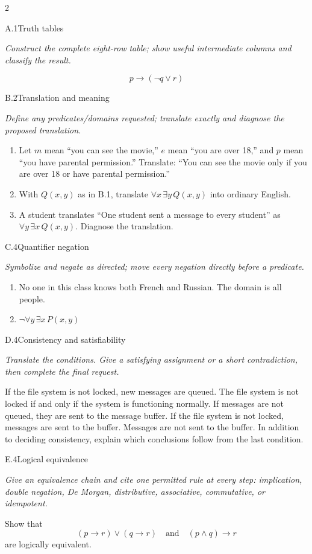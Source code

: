 \documentclass[9pt]{extarticle}
\begin{document}
\begin{multicols}{2}
\begin{CoreProblem}{A.1}{Truth tables}
{\scriptsize\textit{Construct the complete eight-row table; show useful intermediate columns and classify the result.}\par}
\[
  p\to(\neg q\lor r)
\]
\end{CoreProblem}
\begin{CoreProblem}{B.2}{Translation and meaning}
{\scriptsize\textit{Define any predicates/domains requested; translate exactly and diagnose the proposed translation.}\par}
\begin{enumerate}[label=(\alph*)]
  \item Let $m$ mean ``you can see the movie,'' $e$ mean ``you are over 18,''
        and $p$ mean ``you have parental permission.'' Translate: ``You can
        see the movie only if you are over 18 or have parental permission.''
  \item With $Q(x,y)$ as in B.1, translate $\forall x\,\exists y\,Q(x,y)$
        into ordinary English.
  \item A student translates ``One student sent a message to every student''
        as $\forall y\,\exists x\,Q(x,y)$. Diagnose the translation.
\end{enumerate}
\end{CoreProblem}
\begin{CoreProblem}{C.4}{Quantifier negation}
{\scriptsize\textit{Symbolize and negate as directed; move every negation directly before a predicate.}\par}
\begin{enumerate}[label=(\alph*)]
  \item No one in this class knows both French and Russian. The domain is all
        people.
  \item $\neg\forall y\,\exists x\,P(x,y)$
\end{enumerate}
\end{CoreProblem}
\columnbreak
\begin{CoreProblem}{D.4}{Consistency and satisfiability}
{\scriptsize\textit{Translate the conditions. Give a satisfying assignment or a short contradiction, then complete the final request.}\par}
If the file system is not locked, new messages are queued. The file system is
not locked if and only if the system is functioning normally. If messages are
not queued, they are sent to the message buffer. If the file system is not
locked, messages are sent to the buffer. Messages are not sent to the buffer.
In addition to deciding consistency, explain which conclusions follow from the
last condition.
\end{CoreProblem}
\begin{CoreProblem}{E.4}{Logical equivalence}
{\scriptsize\textit{Give an equivalence chain and cite one permitted rule at every step: implication, double negation, De Morgan, distributive, associative, commutative, or idempotent.}\par}
Show that
\[
  (p\to r)\lor(q\to r)
  \quad\text{and}\quad
  (p\land q)\to r
\]
are logically equivalent.
\end{CoreProblem}
\end{multicols}
\end{document}
